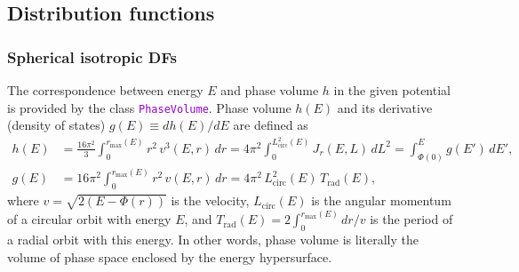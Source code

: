 \documentclass[12pt]{article}
\newcommand{\ttt}[1]{\textcolor{darkviolet}{\texttt{#1}}}
\begin{document}
\subsection{Distribution functions}  \label{sec:DFdetails}

\subsubsection{Spherical isotropic DFs}  \label{sec:DFsphericalDetails}

The correspondence between energy $E$ and phase volume $h$ in the given potential is provided by the class \ttt{PhaseVolume}. Phase volume $h(E)$ and its derivative (density of states) $g(E)\equiv dh(E)/dE$ are defined as
\begin{subequations}
\begin{align}
h(E) &= \frac{16\pi^2}3 \int_0^{r_\mathrm{max}(E)} r^2\, v^3(E,r)\, dr =
  4\pi^2\int_0^{L^2_\mathrm{circ}(E)} J_r(E,L)\,dL^2 =
  \int_{\Phi(0)}^E g(E')\, dE' ,\\
g(E) &= 16\pi^2 \int_0^{r_\mathrm{max}(E)} r^2\, v(E,r)\, dr =
  4\pi^2\, L_\mathrm{circ}^2(E)\, T_\mathrm{rad}(E) ,
\end{align}
\end{subequations}
where  $v = \sqrt{2(E-\Phi(r))}$ is the velocity,  $L_\mathrm{circ}(E)$ is the angular momentum of a circular orbit with energy $E$,  and  $T_\mathrm{rad}(E) = 2 \int_0^{r_\mathrm{max}(E)} dr/v$  is the period of a radial orbit with this energy. In other words, phase volume is literally the volume of phase space enclosed by the energy hypersurface.
\end{document}
